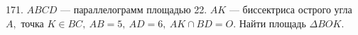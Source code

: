171. $ABCD$ --- параллелограмм площадью 22. $AK$ --- биссектриса острого угла $A,$ точка $K\in BC,\ AB=5,\ AD=6,\ AK\cap BD=O.$ Найти площадь $\Delta BOK.$\\
